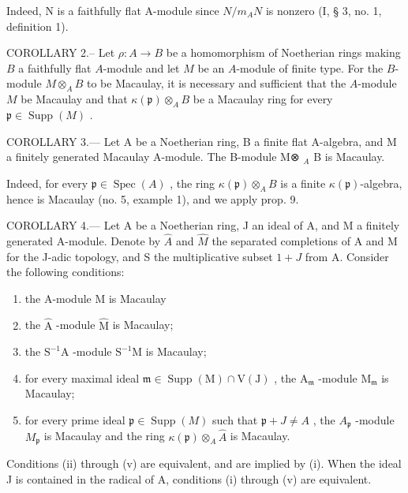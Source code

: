 Indeed, N is a faithfully flat A-module since \(N/m_{A}N\) is nonzero (I, § 3, no. 1, definition 1).

COROLLARY 2.-- Let \(\rho: A \to B\) be a homomorphism of Noetherian rings making \(B\) a faithfully flat \(A\)-module and let \(M\) be an \(A\)-module of finite type. For the \(B\)-module \(M \otimes_{A} B\) to be Macaulay, it is necessary and sufficient that the \(A\)-module \(M\) be Macaulay and that \(\kappa(\mathfrak{p}) \otimes_{A} B\) be a Macaulay ring for every \(\mathfrak{p} \in \operatorname{Supp}(M)\) .

COROLLARY 3.--- Let A be a Noetherian ring, B a finite flat A-algebra, and M a finitely generated Macaulay A-module. The B-module M⊗ \(_{A}\) B is Macaulay.

Indeed, for every \(\mathfrak{p} \in \operatorname{Spec}(A)\) , the ring \(\kappa(\mathfrak{p}) \otimes_{A} B\) is a finite \(\kappa(\mathfrak{p})\)-algebra, hence is Macaulay (no. 5, example 1), and we apply prop. 9.

COROLLARY 4.--- Let A be a Noetherian ring, J an ideal of A, and M a finitely generated A-module. Denote by \(\hat{A}\) and \(\hat{M}\) the separated completions of A and M for the J-adic topology, and S the multiplicative subset \(1 + J\) from A. Consider the following conditions:

\begin{enumerate}
\def\labelenumi{(\roman{enumi})}
\item
  the A-module M is Macaulay
\item
  the \(\widehat{\mathrm{A}}\) -module \(\widehat{\mathrm{M}}\) is Macaulay;
\item
  the \(\mathrm{S}^{-1}\mathrm{A}\) -module \(\mathrm{S}^{-1}\mathrm{M}\) is Macaulay;
\item
  for every maximal ideal \(\mathfrak{m} \in \operatorname{Supp}(\mathrm{M}) \cap \mathrm{V}(\mathrm{J})\) , the \(\mathrm{A}_{\mathfrak{m}}\) -module \(\mathrm{M}_{\mathfrak{m}}\) is Macaulay;
\item
  for every prime ideal \(\mathfrak{p} \in \operatorname{Supp}(M)\) such that \(\mathfrak{p} + J \neq A\) , the \(A_{\mathfrak{p}}\) -module \(M_{\mathfrak{p}}\) is Macaulay and the ring \(\kappa(\mathfrak{p}) \otimes_{A} \widehat{A}\) is Macaulay.
\end{enumerate}

Conditions (ii) through (v) are equivalent, and are implied by (i). When the ideal J is contained in the radical of A, conditions (i) through (v) are equivalent.

